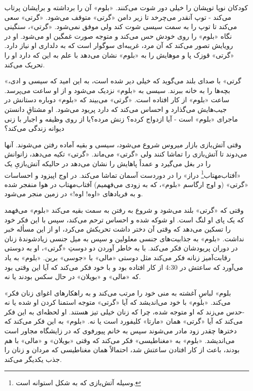 \documentclass[12pt]{book}
\newcommand{\noun}[1]{«{#1}»}
\begin{document}
    کودکان نوپا توپشان را خیلی دور شوت می‌کنند. \noun{بلوم} آن را برداشته و برایشان پرتاب می‌کند - توپ آنقدر می‌چرخد تا زیر دامن \noun{گرتی} متوقف می‌شود. \noun{گرتی} سعی می‌کند تا توپ را به سمت سیسی شوت کند ولی موفق نمی‌شود. \noun{گرتی}، سنگینی نگاه \noun{بلوم} را روی خودش حس می‌کند و متوجه صورت غمگین او می‌شود. او در رویایش تصور می‌کند که آن مرد، غریبه‌ای سوگوار است که به دلداری او نیاز دارد. \noun{گرتی} قوزک پا و موهایش را به \noun{بلوم} نشان می‌دهد با علم به این که دارد او را تحریک می‌کند.

   \noun{گرتی} با صدای بلند می‌گوید که خیلی دیر شده است، به این امید که سیسی و ادی، بچه‌ها را به خانه ببرند. سیسی به \noun{بلوم} نزدیک می‌شود و از او ساعت می‌پرسد. ساعت \noun{بلوم} از کار افتاده است. \noun{گرتی} می‌بیند که \noun{بلوم} دوباره دستانش در جیب‌هایش می‌گذارد و احساس می‌کند که دارد پریود می‌شود. او مشتاقِ دانستن ماجرای \noun{بلوم} است - آیا ازدواج کرده؟ زنش مرده؟یا از روی وظیفه و اجبار با زنی دیوانه زندگی می‌کند؟

    وقتی آتش‌بازی بازار میروس شروع می‌شود، سیسی و بقیه آماده رفتن می‌شوند. آنها می‌دوند تا آتش‌بازی را تماشا کنند ولی \noun{گرتی} می‌ماند. \noun{گرتی} تکیه می‌دهد، زانوانش را در بغل می‌گیرد و عمداً پاهایش را نشان می‌دهد در حالیکه آتش‌بازیِ یک «آفتاب‌مهتاب\footnote{ وسیله آتش‌بازی که به شکل استوانه است.} دراز» را در دوردست آسمان تماشا می‌کند. در اوج اپیزود و احساسات \noun{گرتی} (و اوج ارگاسم \noun{بلوم}، که به زودی می‌فهمیم) آفتاب‌مهتاب در هوا منفجر شده و به فریادهای «اوه! اوه!» در زمین منجر می‌شود.

    وقتی که \noun{گرتی} بلند می‌شود و شروع به رفتن به سمت بقیه می‌کند \noun{بلوم} می‌فهمد که یک پای او لنگ است. او شوکه شده و احساس ترحم می‌کند، سپس با این فکر خود را تسکین می‌دهد که وقتی آن دختر داشت تحریکش می‌کرد، او از این مسأله خبر نداشت. \noun{بلوم} به جذابیت‌های جنسی معلولین و سپس به میل جنسی زیادشوندۀ زنان در دوران پریودشان فکر می‌کند. با به خاطر آوردن دو دوستِ \noun{گرتی}، او به دوستی رقابت‌آمیز زنانه فکر می‌کند مثل دوستی \noun{مالی} با \noun{جوسی} برین. \noun{بلوم} به یاد می‌آورد که ساعتش در 4:30 از کار افتاده بود و با خود فکر می‌کند که آیا این وقتی بود که \noun{مالی} و \noun{بویلان} در حال سکس بودند یا نه.

    \noun{بلوم} لباسِ آغشته به منی خود را مرتب می‌کند و به راهکارهای اغوای زنان فکر می‌کند. \noun{بلوم} با خود می‌اندیشد که آیا \noun{گرتی} متوجه استمنا کردن او شده یا نه -حدس می‌زند که او متوجه شده، چرا که زنان خیلی تیز هستند. او لحظه‌ای به این فکر می‌کند که آیا \noun{گرتی} همان \noun{مارتا} کلیفورد است یا نه. \noun{بلوم} به این فکر می‌کند که دخترها چقدر زود مادر می‌شوند سپس به خانم پیورفوی که در زایشگاه مجاور است می‌اندیشد. \noun{بلوم} به «مغناطیسی» فکر می‌کند که وقتی \noun{بویلان} و \noun{مالی} با هم بودند، باعث از کار افتادن ساعتش شد، احتمالاً همان مغناطیسی که مردان و زنان را جذب یکدیگر می‌کند.
\end{document}
